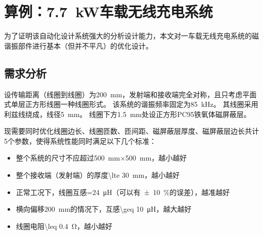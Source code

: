 \documentclass[index]{subfiles}
\begin{document}
\chapter{算例：\SI{7.7}{\kilo\watt}车载无线充电系统}\label{sec:example}
为了证明该自动化设计系统强大的分析设计能力，本文对一车载无线充电系统的磁谐振部件进行基本（但并不平凡）的优化设计。

\section{需求分析}\label{sec:example-req}
设传输距离（线圈到线圈）为\SI{200}{\milli\metre}，发射端和接收端完全对称，且只考虑平面式单层正方形线圈一种线圈形式。
该系统的谐振频率固定为\SI{85}{\kilo\hertz}。
其线圈采用利兹线绕成，线径\SI{5}{\milli\metre}。
线圈下方\SI{1.5}{\milli\metre}处设正方形PC95铁氧体磁屏蔽层。

现需要同时优化线圈边长、线圈匝数、匝间距、磁屏蔽层厚度、磁屏蔽层边长共计5个参数，使得系统性能同时满足以下几个标准：
\begin{itemize}
  \item 整个系统的尺寸不应超过\SI{500}{\milli\metre}$\times$\SI{500}{\milli\metre}，越小越好
  \item 整个接收端（发射端）的厚度\SI{\lte 30}{\milli\metre}，越小越好
  \item 正常工况下，线圈互感\SI{=24}{\micro\henry}（可以有\SI{\pm 10}{\percent}的误差），越准越好
  \item 横向偏移\SI{200}{\milli\metre}的情况下，互感\SI{\geq 10}{\micro\henry}，越大越好
  \item 线圈电阻\SI{\leq 0.4}{\ohm}，越小越好
\end{itemize}
\end{document}
